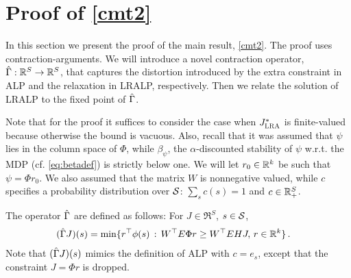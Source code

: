\documentclass[12pt,draftcls,onecolumn]{IEEEtran}
\begin{document}
\section{Proof of \cref{cmt2}}\label{sec:improv}
In this section we present the proof of the main result, \cref{cmt2}.
The proof uses contraction-arguments.
\newcommand{\G}{\Gamma}
We will introduce a novel contraction operator, $\hg: \Re^S \to \Re^S$, that captures the distortion introduced
by the extra constraint in ALP and the relaxation in LRALP, respectively.
Then we relate the solution of LRALP to the fixed point of $\hg$.

Note that for the proof it suffices to consider the case when $\Jlro$ is finite-valued because otherwise the bound is vacuous.
Also, recall that it was assumed that $\psi$ lies in the column space of $\Phi$, while $\beta_\psi$, the $\alpha$-discounted stability of $\psi$ w.r.t. the MDP (cf. \eqref{eq:betadef}) is strictly below one. We will let $r_0\in \R^k$ be such that $\psi = \Phi r_0$.
We also assumed that the matrix $W$ is nonnegative valued, while $c$ specifies a probability distribution over $\S$: $\sum_s c(s) = 1$ and $c\in \R_+^S$.

The operator $\hg$ are defined as follows: For $J\in \Re^S$, $s\in \S$,
\begin{align*}
(\hg J)(s) & = \min\{ r^\top \phi(s) \,:\, W^\top E \Phi r \ge W^\top E H J ,\, r\in \Re^k\}\,.
\end{align*}
Note that $(\hg J)(s)$ mimics the definition of ALP with $c = e_s$, except that the constraint $J = \Phi r$ is dropped.
\end{document}
